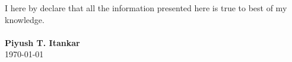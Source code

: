 
\reversemarginpar {}
\noindent 
I here by declare that all the information presented here is true to best of my knowledge.
\\
\\
\noindent
\textbf{Piyush T. Itankar}\\
\today
